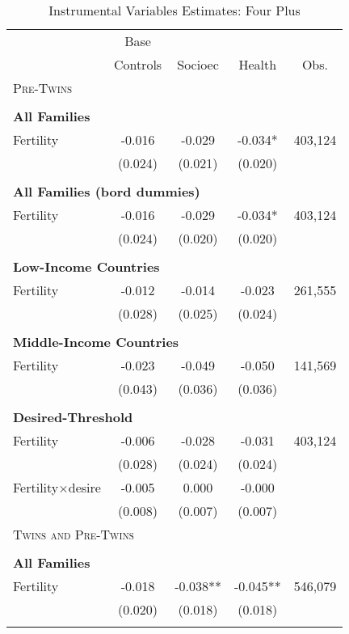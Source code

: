 \begin{table}[!htbp] \centering 
\caption{Instrumental Variables Estimates: Four Plus} \vspace{4mm} 
\label{TWINtab:IVFourplus} 
\begin{tabular}{lcccc} \toprule \toprule 
&Base&&&\\
&Controls&Socioec&Health&Obs.\\\midrule
\multicolumn{5}{l}{\textsc{Pre-Twins}}\\ 
&&&&\\
\multicolumn{5}{l}{\textbf{All Families}}\\ 
Fertility&-0.016&-0.029&-0.034*&403,124\\
         &(0.024)&(0.021)&(0.020)&\\
&&&&\\
\multicolumn{5}{l}{\textbf{All Families (bord dummies)}}\\ 
Fertility&-0.016&-0.029&-0.034*&403,124\\
         &(0.024)&(0.020)&(0.020)&\\
&&&&\\
\multicolumn{5}{l}{\textbf{Low-Income Countries}}\\ 
Fertility&-0.012&-0.014&-0.023&261,555\\
         &(0.028)&(0.025)&(0.024)&\\
&&&&\\
\multicolumn{5}{l}{\textbf{Middle-Income Countries}}\\ 
Fertility&-0.023&-0.049&-0.050&141,569\\
         &(0.043)&(0.036)&(0.036)&\\
&&&&\\
\multicolumn{5}{l}{\textbf{Desired-Threshold}}\\ 
Fertility&-0.006&-0.028&-0.031&403,124\\
         &(0.028)&(0.024)&(0.024)&\\
Fertility$\times$desire&-0.005&0.000&-0.000&\\
         &(0.008)&(0.007)&(0.007)&\\
\midrule\multicolumn{5}{l}{\textsc{Twins and Pre-Twins}}\\ 
&&&&\\
\multicolumn{5}{l}{\textbf{All Families}}\\ 
Fertility&-0.018&-0.038**&-0.045**&546,079\\
         &(0.020)&(0.018)&(0.018)&\\
&&&&\\

\end{tabular}
\end{table}
